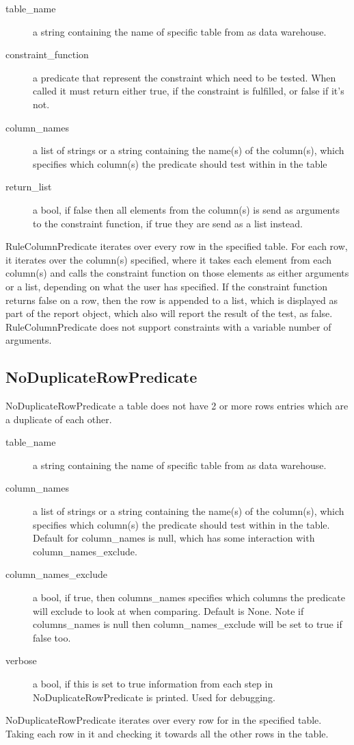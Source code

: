 
\begin{description}
\item [table\_name] a string containing the name of specific table from as data warehouse. 
\item [constraint\_function] a predicate that represent the constraint which need to be tested. When called it must return either true, if the constraint is fulfilled, or false if it's not.
\item [column\_names] a list of strings or a string containing the name(s) of the column(s), which specifies which column(s) the predicate should test within in the table
\item [return\_list] a bool, if false then all elements from the column(s) is send as arguments to the constraint function, if true they are send as a list instead.
\end{description}

RuleColumnPredicate iterates over every row in the specified table. For each row, it iterates over the column(s) specified, where it takes each element from each column(s) and calls the constraint function on those elements as either arguments or a list, depending on what the user has specified. If the constraint function returns false on a row, then the row is appended to a list, which is displayed as part of the report object, which also will report the result of the test, as false. RuleColumnPredicate does not support constraints with a variable number of arguments.

\subsection{NoDuplicateRowPredicate}

NoDuplicateRowPredicate a table does not have 2 or more rows entries which are a duplicate of each other. 


\begin{description}
\item [table\_name] a string containing the name of specific table from as data warehouse. 
\item [column\_names] a list of strings or a string containing the name(s) of the column(s), which specifies which column(s) the predicate should test within in the table. Default for column\_names is null, which has some interaction with column\_names\_exclude.
\item [column\_names\_exclude] a bool, if true, then columns\_names specifies which columns the predicate will exclude to look at when comparing. Default is None. Note if columns\_names is null then column\_names\_exclude will be set to true if false too.
\item [verbose] a bool, if this is set to true information from each step in NoDuplicateRowPredicate is printed. Used for debugging.
\end{description}

NoDuplicateRowPredicate iterates over every row for in the specified table. Taking each row in it and checking it towards all the other rows in the table. 
